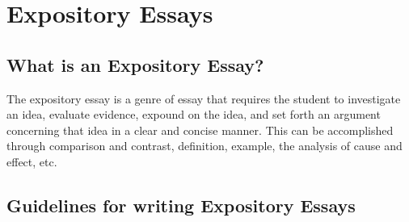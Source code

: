 \chapter{Expository Essays}

\section{What is an Expository Essay?}
	The expository essay is a genre of essay that requires the student to investigate an idea, evaluate evidence, expound on the idea, and set forth an argument concerning that idea in a clear and concise manner. This can be accomplished through comparison and contrast, definition, example, the analysis of cause and effect, etc.

\section{Guidelines for writing Expository Essays}
